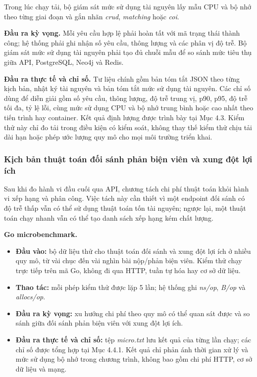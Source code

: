 Trong lúc chạy tải, bộ giám sát mức sử dụng tài nguyên lấy mẫu CPU và bộ nhớ theo từng giai đoạn và gắn nhãn \textit{crud}, \textit{matching} hoặc \textit{coi}.

\textbf{Đầu ra kỳ vọng.} Mỗi yêu cầu hợp lệ phải hoàn tất với mã trạng thái thành công; hệ thống phải ghi nhận số yêu cầu, thông lượng và các phân vị độ trễ. Bộ giám sát mức sử dụng tài nguyên phải tạo đủ chuỗi mẫu để so sánh mức tiêu thụ giữa API, PostgreSQL, Neo4j và Redis.

\textbf{Đầu ra thực tế và chỉ số.} Tư liệu chính gồm bản tóm tắt JSON theo từng kịch bản, nhật ký tài nguyên và bản tóm tắt mức sử dụng tài nguyên. Các chỉ số dùng để diễn giải gồm số yêu cầu, thông lượng, độ trễ trung vị, p90, p95, độ trễ tối đa, tỷ lệ lỗi, cùng mức sử dụng CPU và bộ nhớ trung bình hoặc cao nhất theo tiến trình hay container. Kết quả định lượng được trình bày tại Mục 4.3. Kiểm thử này chỉ đo tải trong điều kiện có kiểm soát, không thay thế kiểm thử chịu tải dài hạn hoặc phép ước lượng quy mô cho mọi môi trường triển khai.

\subsubsection{Kịch bản thuật toán đối sánh phản biện viên và xung đột lợi ích}

Sau khi đo hành vi đầu cuối qua API, chương tách chi phí thuật toán khỏi hành vi xếp hạng và phân công. Việc tách này cần thiết vì một endpoint đối sánh có độ trễ thấp vẫn có thể sử dụng thuật toán tốn tài nguyên; ngược lại, một thuật toán chạy nhanh vẫn có thể tạo danh sách xếp hạng kém chất lượng.

\textbf{Go microbenchmark.}

\begin{itemize}
  \item \textbf{Đầu vào:} bộ dữ liệu thử cho thuật toán đối sánh và xung đột lợi ích ở nhiều quy mô, từ vài chục đến vài nghìn bài nộp/phản biện viên. Kiểm thử chạy trực tiếp trên mã Go, không đi qua HTTP, tuần tự hóa hay cơ sở dữ liệu.
  \item \textbf{Thao tác:} mỗi phép kiểm thử được lặp 5 lần; hệ thống ghi \textit{ns/op}, \textit{B/op} và \textit{allocs/op}.
  \item \textbf{Đầu ra kỳ vọng:} xu hướng chi phí theo quy mô có thể quan sát được và so sánh giữa đối sánh phản biện viên với xung đột lợi ích.
  \item \textbf{Đầu ra thực tế và chỉ số:} tệp \textit{micro.txt} lưu kết quả của từng lần chạy; các chỉ số được tổng hợp tại Mục 4.4.1. Kết quả chỉ phản ánh thời gian xử lý và mức sử dụng bộ nhớ trong chương trình, không bao gồm chi phí HTTP, cơ sở dữ liệu và mạng.
\end{itemize}


